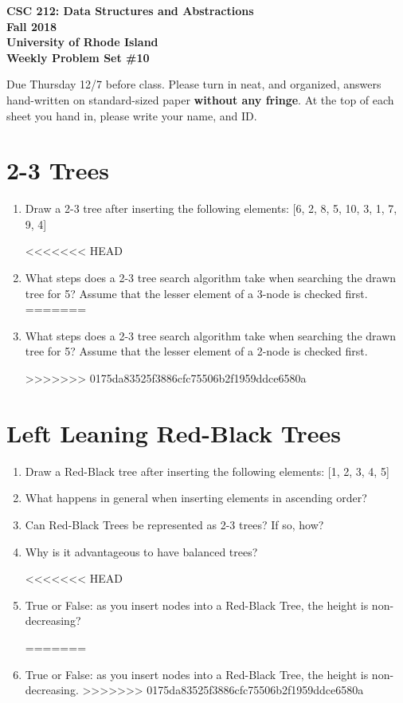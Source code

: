 \documentclass[11pt]{article}
\begin{document}
    \thispagestyle{empty}
    
    \begin{center}
        {\Large\bf CSC 212: Data Structures and Abstractions}\\
        \medskip
        {\Large\bf Fall 2018}\\
        \medskip
        {\Large\bf University of Rhode Island}\\
        \bigskip
        {\Large\bf Weekly Problem Set \#10}
    \end{center}
    
    Due Thursday 12/7 before class. Please turn in neat, and organized, answers hand-written on standard-sized paper \textbf{without any fringe}. At the top of each sheet you hand in, please write your name, and ID.
    \section{2-3 Trees}
\begin{enumerate}
    \item Draw a 2-3 tree after inserting the following elements: [6, 2, 8, 5, 10, 3, 1, 7, 9, 4]

<<<<<<< HEAD
    \item What steps does a 2-3 tree search algorithm take when searching the drawn tree for 5? Assume that the lesser element of a 3-node is checked first.
=======
    \item What steps does a 2-3 tree search algorithm take when searching the drawn tree for 5? Assume that the lesser element of a 2-node is checked first.
    
>>>>>>> 0175da83525f3886cfc75506b2f1959ddce6580a
\end{enumerate}

\section{Left Leaning Red-Black Trees}
\begin{enumerate}
    \item Draw a Red-Black tree after inserting the following elements: [1, 2, 3, 4, 5]
    
    \item What happens in general when inserting elements in ascending order?
    
    \item Can Red-Black Trees be represented as 2-3 trees? If so, how?

    \item Why is it advantageous to have balanced trees?

<<<<<<< HEAD
    \item True or False: as you insert nodes into a Red-Black Tree, the height is non-decreasing?
    
=======
    \item True or False: as you insert nodes into a Red-Black Tree, the height is non-decreasing.
>>>>>>> 0175da83525f3886cfc75506b2f1959ddce6580a
\end{enumerate}
    
    \label{r:lastpage}
    
    
\end{document}
